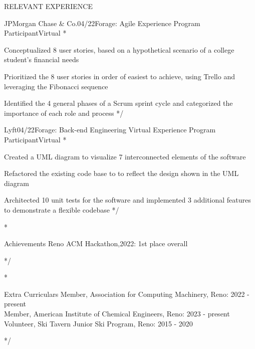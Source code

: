 \documentclass{resume} %
\begin{document}
\begin{rSection}{RELEVANT EXPERIENCE}


	\begin{emptyrSubsection}{JPMorgan Chase \& Co.}{04/22}{Forage: Agile Experience Program Participant}{Virtual}
		\/*
		\item Conceptualized 8 user stories, based on a hypothetical scenario of a college student’s financial needs
		\item Prioritized the 8 user stories in order of easiest to achieve, using Trello and leveraging the Fibonacci sequence
		\item Identified the 4 general phases of a Scrum sprint cycle and categorized the importance of each role and process
		*/
	\end{emptyrSubsection}

	\begin{emptyrSubsection}{Lyft}{04/22}{Forage: Back-end Engineering Virtual Experience Program Participant}{Virtual}
		\/*
		\item Created a UML diagram to visualize 7 interconnected elements of the software
		\item Refactored the existing code base to to reflect the design shown in the UML diagram
		\item Architected 10 unit tests for the software and implemented 3 additional features to demonstrate a flexible codebase
		*/
	\end{emptyrSubsection}

\end{rSection}


\/*
\begin{rSection}{Achievements}
	{Reno ACM Hackathon,2022: 1st place overall}
\end{rSection}
*/


\/*
\begin{rSection}{Extra Curriculars}
	{Member, Association for Computing Machinery, Reno: 2022 - present}\\
	{Member, American Institute of Chemical Engineers, Reno: 2023 - present}\\
	{Volunteer, Ski Tavern Junior Ski Program, Reno: 2015 - 2020}\\
\end{rSection}
*/

\end{document}
